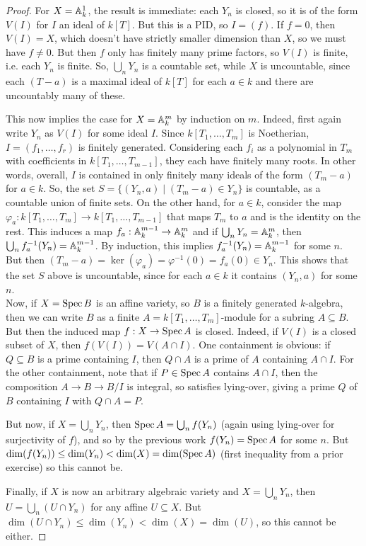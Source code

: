\begin{proof}
	For $X = \AA^1_k$, the result is immediate: each $Y_n$ is closed, so it is of the form $V(I)$ for $I$ an ideal of $k[T]$. But this is a PID, so $I = (f)$. If $f = 0$, then $V(I) = X$, which doesn't have strictly smaller dimension than $X$, so we must have $f \neq 0$. But then $f$ only has finitely many prime factors, so $V(I)$ is finite, i.e. each $Y_n$ is finite. So, $\bigcup_n Y_n$ is a countable set, while $X$ is uncountable, since each $(T-a)$ is a maximal ideal of $k[T]$ for each $a \in k$ and there are uncountably many of these.
	
	This now implies the case for $X = \AA^m_k$ by induction on $m$. Indeed, first again write $Y_n$ as $V(I)$ for some ideal $I$. Since $k[T_1,\ldots,T_m]$ is Noetherian, $I = (f_1,\ldots,f_r)$ is finitely generated. Considering each $f_i$ as a polynomial in $T_m$ with coefficients in $k[T_1,\ldots,T_{m-1}]$, they each have finitely many roots. In other words, overall, $I$ is contained in only finitely many ideals of the form $(T_m - a)$ for $a \in k$. So, the set $S = \{(Y_n,a) \mid (T_m-a) \in Y_n \}$ is countable, as a countable union of finite sets. On the other hand, for $a \in k$, consider the map $\varphi_a : k[T_1,\ldots,T_m] \to k[T_1,\ldots,T_{m-1}]$ that maps $T_m$ to $a$ and is the identity on the rest. This induces a map $f_a : \AA^{m-1}_k \to \AA^m_k$ and if $\bigcup_n Y_n = \AA^m_k$, then $\bigcup_n f_a^{-1}(Y_n) = \AA^{m-1}_k$. By induction, this implies $f_a^{-1}(Y_n) = \AA^{m-1}_k$ for some $n$. But then $(T_m-a) = \ker(\varphi_a) = \varphi^{-1}(0) = f_a(0) \in Y_n$. This shows that the set $S$ above is uncountable, since for each $a \in k$ it contains $(Y_n,a)$ for some $n$. \\
	
	Now, if $X = \Spec B$ is an affine variety, so $B$ is a finitely generated $k$-algebra, then we can write $B$ as a finite $A = k[T_1,\ldots,T_m]$-module for a subring $A \subseteq B$. But then the induced map $f : X \to \Spec A$ is closed. Indeed, if $V(I)$ is a closed subset of $X$, then $f(V(I)) = V(A \cap I)$. One containment is obvious: if $Q \subseteq B$ is a prime containing $I$, then $Q \cap A$ is a prime of $A$ containing $A \cap I$. For the other containment, note that if $P \in \Spec A$ contains $A \cap I$, then the composition $A \to B \to B/I$ is integral, so satisfies lying-over, giving a prime $Q$ of $B$ containing $I$ with $Q \cap A = P$.
	
	But now, if $X = \bigcup_n Y_n$, then $\Spec A = \bigcup_n f(Y_n)$ (again using lying-over for surjectivity of $f$), and so by the previous work $f(Y_n) = \Spec A$ for some $n$. But $\dim(f(Y_n)) \leq \dim(Y_n) < \dim(X) = \dim(\Spec A)$ (first inequality from a prior exercise) so this cannot be.
	
	Finally, if $X$ is now an arbitrary algebraic variety and $X = \bigcup_n Y_n$, then $U = \bigcup_n (U \cap Y_n)$ for any affine $U \subseteq X$. But $\dim(U \cap Y_n) \leq \dim(Y_n) < \dim(X) = \dim(U)$, so this cannot be either.
\end{proof}
